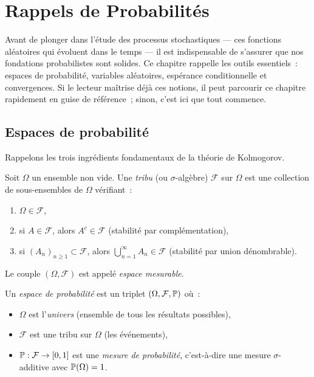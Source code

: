 \chapter{Rappels de Probabilit\'es}
\label{ch:rappels}

Avant de plonger dans l'\'etude des processus stochastiques --- ces
fonctions al\'eatoires qui \'evoluent dans le temps --- il est indispensable
de s'assurer que nos fondations probabilistes sont solides. Ce chapitre
rappelle les outils essentiels~: espaces de probabilit\'e, variables
al\'eatoires, esp\'erance conditionnelle et convergences. Si le lecteur
ma\^itrise d\'ej\`a ces notions, il peut parcourir ce chapitre rapidement en
guise de r\'ef\'erence~; sinon, c'est ici que tout commence.

\section{Espaces de probabilit\'e}

Rappelons les trois ingr\'edients fondamentaux de la th\'eorie de Kolmogorov.

\begin{definition}[Tribu]
Soit $\Omega$ un ensemble non vide. Une \emph{tribu} (ou $\sigma$-alg\`ebre)
$\mathcal{F}$ sur $\Omega$ est une collection de sous-ensembles de $\Omega$
v\'erifiant~:
\begin{enumerate}
  \item $\Omega \in \mathcal{F}$,
  \item si $A \in \mathcal{F}$, alors $A^c \in \mathcal{F}$ (stabilit\'e par compl\'ementation),
  \item si $(A_n)_{n \geq 1} \subset \mathcal{F}$, alors $\bigcup_{n=1}^{\infty} A_n \in \mathcal{F}$
    (stabilit\'e par union d\'enombrable).
\end{enumerate}
Le couple $(\Omega, \mathcal{F})$ est appel\'e \emph{espace mesurable}.
\end{definition}

\begin{definition}
Un \emph{espace de probabilit\'e} est un triplet $(\Omega, \mathcal{F}, \mathbb{P})$ o\`u~:
\begin{itemize}
  \item $\Omega$ est l'\emph{univers} (ensemble de tous les r\'esultats possibles),
  \item $\mathcal{F}$ est une tribu sur $\Omega$ (les \'ev\'enements),
  \item $\mathbb{P} : \mathcal{F} \to [0,1]$ est une \emph{mesure de probabilit\'e}, c'est-\`a-dire
    une mesure $\sigma$-additive avec $\mathbb{P}(\Omega) = 1$.
\end{itemize}
\end{definition}

